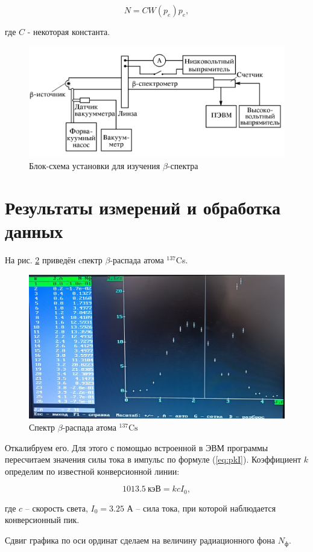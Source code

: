 \documentclass[a4paper, 12pt]{article}
\newcommand{\elem}[3]{{}^{#2}_{#3}\text{#1}}
\newcommand{\Cs}{\elem{Cs}{137}{}}
\begin{document}
    \begin{equation}
        \label{eq:N}
        N = CW(p_e)p_e,
    \end{equation}

    где $C$ - некоторая константа.

    \begin{figure}[H]
        \centering
        \includegraphics[width = 0.5\linewidth]{images/scheme.png}
        \caption{Блок-схема установки для изучения $\beta$-спектра}
        \label{fig:scheme}
    \end{figure}

    \newpage
	
    \section{Результаты измерений и обработка данных}

    На рис. \ref{fig:spectrum} приведён cпектр $\beta$-распада атома $^{137}$Cs. 

    \begin{figure}[H]
        \centering
        \includegraphics[width=0.5\linewidth]{images/spectrum.jpg}
        \caption{Спектр $\beta$-распада атома $\Cs$}
        \label{fig:spectrum}
    \end{figure}
    
    Откалибруем его. Для этого с помощью встроенной в ЭВМ программы пересчитаем значения силы тока в импульс по формуле (\ref{eq:pkI}). Коэффициент $k$ определим по известной конверсионной линии:
    
    $$1013.5 \ \text{кэВ} = kcI_0,$$
    
    где $c$ -- скорость света, $I_0 = 3.25$ А -- сила тока, при которой наблюдается конверсионный пик.
		
    Сдвиг графика по оси ординат сделаем на величину радиационного фона $N_\text{ф}$.
\end{document}
